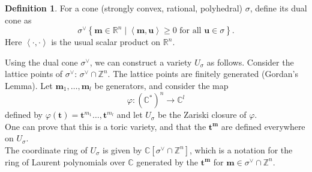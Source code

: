 \documentclass[a4paper]{article}
\theoremstyle{definition}
\newtheorem{definition}[theorem]{Definition}
\begin{document}
  \begin{definition}
    For a cone (strongly convex, rational, polyhedral) $\sigma$, define its dual cone as 
    \[
      \sigma ^{ \vee}\left\{ \boldsymbol{m} \in \mathbb{R}^{n}\mid \left\langle \boldsymbol{m} ,\boldsymbol{u}  \right\rangle\geq 0 \text{ for all } \boldsymbol{ u } \in \sigma\right\}.
    \]
    Here $\left\langle \cdot, \cdot \right\rangle$ is the usual scalar product on $\mathbb{R}^{n}$.
  \end{definition}

  Using the dual cone $\sigma^{\vee}$, we can construct a variety $U_{\sigma}$ as follows. Consider the lattice points of $\sigma^{\vee}$: $\sigma^{\vee} \cap \mathbb{Z}^{n}$. The lattice points are finitely generated (Gordan's Lemma). Let $\boldsymbol{m} _{1}, \dots, \boldsymbol{m} _{l}$ be generators, and consider the map 
  \[
    \varphi \colon \left( \mathbb{C}^{*} \right) ^{n} \rightarrow  \mathbb{C}^{l}
  \]
  defined by $\varphi \left( \boldsymbol{t}  \right) = \boldsymbol{t} ^{m_{1}} \dots, \boldsymbol{t} ^{m_{l}}$ and let $U_{\sigma}$ be the Zariski closure of $\varphi$.\\
  One can prove that this is a toric variety, and that the $\boldsymbol{t^{m}} $ are defined everywhere on $U_{\sigma}$.\\
  The coordinate ring of $U_{\sigma}$ is given by $\mathbb{C} \left[ \sigma^{\vee} \cap \mathbb{Z}^{n} \right]$, which is a notation for the ring of Laurent polynomials over $\mathbb{C}$ generated by the $\boldsymbol{t^{m}} $ for $\boldsymbol{m}  \in \sigma^{\vee }\cap\mathbb{Z}^{n}$.

  
  
\end{document}
